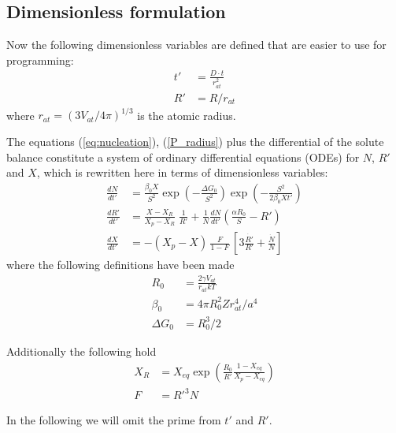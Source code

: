 \documentclass[12pt,a4paper]{article}
\begin{document}
\subsection{Dimensionless formulation}
Now the following dimensionless variables are defined that are easier to use for programming:
\begin{subequations}
	\begin{align}
t' &= \frac{D\cdot t}{r_{at}^2} \\
R' &= R / r_{at}
	\end{align}
\end{subequations}
where $r_{at} = (3V_{at}/4\pi)^{1/3}$ is the atomic radius.

The equations (\ref{eq:nucleation}), (\ref{P_radius}) plus the differential of the solute balance constitute a system of ordinary differential equations (ODEs) for $N$, $R'$ and $X$, which is rewritten here in terms of dimensionless variables:
\begin{subequations}
\label{eq:ngode}
\begin{align}
\frac{dN}{dt'} &= 
\frac{\beta_0 X}{S^2} 
\exp\left( -\frac{\Delta G_0}{S^2}\right)  
\exp\left( -\frac{S^2}{2\beta_0 X t'}\right)  \\
\frac{dR'}{dt'} &=  
\frac{X - X_R}{X_p - X_R} 
\; \frac{1}{R'}
+ 
\frac{1}{N}\frac{dN}{dt'}
\left( \frac{\alpha R_0}{S} - R' \right) \\
\frac{dX}{dt'} &= -(X_p - X)\, \frac{F}{1-F} \,
\left[ 3\frac{\dot{R'}}{R'} + \frac{\dot{N}}{N} \right]
\end{align}
\end{subequations}
where the following definitions have been made
\begin{subequations}
\begin{align}
R_0 &= \frac{2\gamma V_{at}}{r_{at}kT} \\ 
\beta_0 &= 4\pi R_0^2 Z r_{at}^4/ a^4 \\
\Delta G_0 &= R_0^3/2  
\end{align}
\end{subequations}

Additionally the following hold
\begin{subequations}
\begin{align}
X_R &= X_{eq} \exp 
\left( \frac{R_0}{R'} \frac{1-X_{eq}}{X_p - X_{eq}}\right) \\
F &= R'^3 N
\end{align}
\end{subequations}

In the following we will omit the prime from $t'$ and $R'$.
\end{document}
